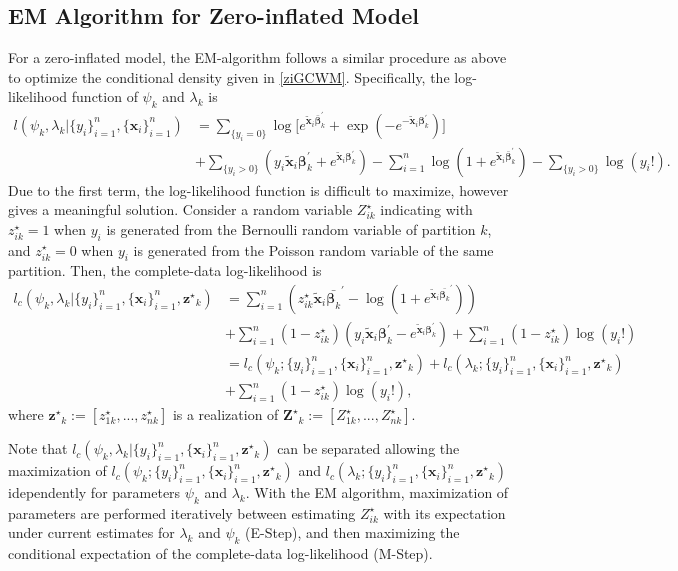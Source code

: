\documentclass[12pt,letterpaper]{article}
\numberwithin{equation}{section}
\numberwithin{equation}{section}
\numberwithin{equation}{section}
\newcommand{\xTilda}{\tilde{\bm{x}}}
\newcommand{\zZ}{Z^\star}
\newcommand{\zz}{z^\star}
\begin{document}
\subsection{EM Algorithm for Zero-inflated Model} 
For a zero-inflated model, the EM-algorithm follows a similar procedure as above to optimize the conditional density given in \eqref{ziGCWM}.  Specifically, the log-likelihood function of $\psi_k$ and $\lambda_k$ is 
\begin{equation*}\begin{split}
l(\psi_k,\lambda_k| \{y_i\}_{i=1}^n,\{\bm{x}_i\}_{i=1}^n) &= \sum_{\{y_i = 0\}} \log \big[ e^{ \bm{ \xTilda}_i \bm{\bar{\beta}}_k^{'}  } + \exp{( - e^ { -\bm{\xTilda}_i \bm{\beta}_k^{'} })} \big]  \\ & +  \sum_{\{y_i > 0\}} \left( y_i \xTilda_i \bm{\beta}_k^{'} + e^{ \xTilda_i \bm{\beta}_k^{'} } \right)  - \sum_{i=1}^n  \log \left(1 + e^ {\xTilda_i \bm{\bar{\beta}}_k^{'} } \right) - \sum_{\{y_i > 0\}} \log(y_i ! ).
\end{split}\end{equation*}
Due to the first term, the log-likelihood function is difficult to maximize, however \cite{Lambert} gives a meaningful solution.  Consider a random variable $\zZ_{ik}$ indicating with ${\zz_{ik}} = 1$ when $y_i$ is generated from the Bernoulli random variable of partition $k$, and $\zz_{ik} = 0$ when $y_i$ is generated from the Poisson random variable of the same partition.  Then, the complete-data log-likelihood is 
\begin{align*}
l_c(\psi_k,\lambda_k| \{y_i\}_{i=1}^n,\{\bm{x}_i\}_{i=1}^n,{\bm{\zz}_k}) &= \sum_{i=1}^n \left( \zz_{ik}\xTilda_i \bar{\bm{\beta}_k }^{'} - \log\left(1+ e^{ \xTilda_i \bar{\bm{\beta}_k }^{'}}\right) \right)  \\ & + \sum_{i=1}^n (1-\zz_{ik}) (y_i \xTilda_i \bm{\beta}_k^{'}  - e^{\xTilda_i \bm{\beta}_k^{'}})+ \sum_{i=1}^n (1-\zz_{ik})\log(y_i!)\\
&= l_c(\psi_k;\{y_i\}_{i=1}^n,\{\bm{x}_i\}_{i=1}^n,{{\bm{\zz}_k}}) + l_c(\lambda_k; \{y_i\}_{i=1}^n,\{\bm{x}_i\}_{i=1}^n,{{\bm{\zz}_k}}) \\
&+ \sum_{i=1}^n (1- \zz_{ik})\log(y_i!), %
\end{align*}
where $\bm{\zz}_k := \left[\zz_{1k}, ..., \zz_{nk} \right]$ is a realization of $\bm{\zZ}_k  := \left[\zZ_{1k}, ..., \zZ_{nk} \right]$.
 
 Note that $l_c(\psi_k,\lambda_k|\{y_i\}_{i=1}^n,\{\bm{x}_i\}_{i=1}^n,\bm{\zz}_k)$ can be separated allowing the maximization of $l_c(\psi_k; \{y_i\}_{i=1}^n,\{\bm{x}_i\}_{i=1}^n,\bm{\zz}_k)$ and $l_c(\lambda_k; \{y_i\}_{i=1}^n,\{\bm{x}_i\}_{i=1}^n,\bm{\zz}_k) $ idependently for parameters $\psi_k$ and $\lambda_k$. With the EM algorithm, maximization of parameters are performed iteratively between estimating $\zZ_{ik}$ with its expectation under current estimates for $\lambda_k$ and $\psi_k$ (E-Step), and then maximizing the conditional expectation of the complete-data log-likelihood (M-Step). 
\end{document}
